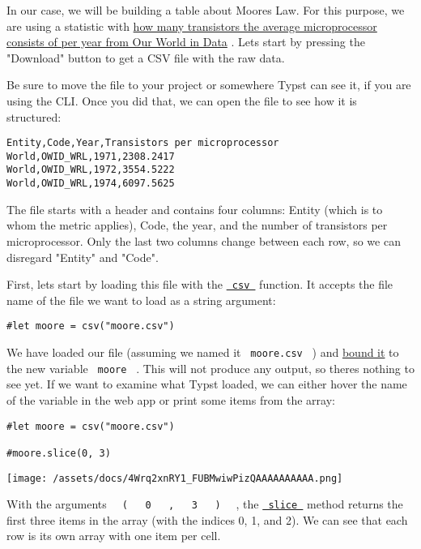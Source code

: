 In our case, we will be building a table about Moore\textquotesingle s
Law. For this purpose, we are using a statistic with
\href{https://ourworldindata.org/grapher/transistors-per-microprocessor}{how
many transistors the average microprocessor consists of per year from
Our World in Data} . Let\textquotesingle s start by pressing the
"Download" button to get a CSV file with the raw data.

Be sure to move the file to your project or somewhere Typst can see it,
if you are using the CLI. Once you did that, we can open the file to see
how it is structured:

\begin{verbatim}
Entity,Code,Year,Transistors per microprocessor
World,OWID_WRL,1971,2308.2417
World,OWID_WRL,1972,3554.5222
World,OWID_WRL,1974,6097.5625
\end{verbatim}

The file starts with a header and contains four columns: Entity (which
is to whom the metric applies), Code, the year, and the number of
transistors per microprocessor. Only the last two columns change between
each row, so we can disregard "Entity" and "Code".

First, let\textquotesingle s start by loading this file with the
\href{/docs/reference/data-loading/csv/}{\texttt{\ csv\ }} function. It
accepts the file name of the file we want to load as a string argument:

\begin{verbatim}
#let moore = csv("moore.csv")
\end{verbatim}

We have loaded our file (assuming we named it \texttt{\ moore.csv\ } )
and \href{/docs/reference/scripting/\#bindings}{bound it} to the new
variable \texttt{\ moore\ } . This will not produce any output, so
there\textquotesingle s nothing to see yet. If we want to examine what
Typst loaded, we can either hover the name of the variable in the web
app or print some items from the array:

\begin{verbatim}
#let moore = csv("moore.csv")

#moore.slice(0, 3)
\end{verbatim}

\texttt{[image: /assets/docs/4Wrq2xnRY1\_FUBMwiwPizQAAAAAAAAAA.png]}

With the arguments
\texttt{\ }{\texttt{\ (\ }}\texttt{\ }{\texttt{\ 0\ }}\texttt{\ }{\texttt{\ ,\ }}\texttt{\ }{\texttt{\ 3\ }}\texttt{\ }{\texttt{\ )\ }}\texttt{\ }
, the
\href{/docs/reference/foundations/array/\#definitions-slice}{\texttt{\ slice\ }}
method returns the first three items in the array (with the indices 0,
1, and 2). We can see that each row is its own array with one item per
cell.

